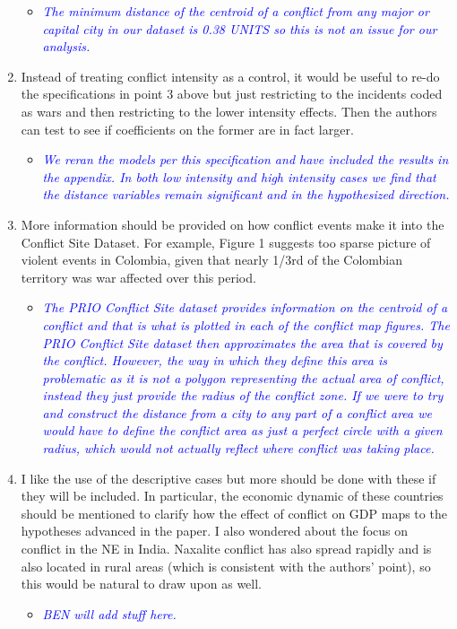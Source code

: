 \begin{enumerate}
\begin{itemize}
\item \textcolor{blue}{\emph{
	The minimum distance of the centroid of a conflict from any major or capital city in our dataset is 0.38 UNITS so this is not an issue for our analysis.
}}
\end{itemize}

\item Instead of treating conflict intensity as a control, it would be useful to re-do the specifications in point 3 above but just restricting to the incidents coded as wars and then restricting to the lower intensity effects. Then the authors can test to see if coefficients on the former are in fact larger.

\begin{itemize}
\item \textcolor{blue}{\emph{
	We reran the models per this specification and have included the results in the appendix. In both low intensity and high intensity cases we find that the distance variables remain significant and in the hypothesized direction. 
}}
\end{itemize}

\item More information should be provided on how conflict events make it into the Conflict Site Dataset. For example, Figure 1 suggests too sparse picture of violent events in Colombia, given that nearly 1/3rd of the Colombian territory was war affected over this period.

\begin{itemize}
\item \textcolor{blue}{\emph{
	The PRIO Conflict Site dataset provides information on the centroid of a conflict and that is what is plotted in each of the conflict map figures. The PRIO Conflict Site dataset then approximates the area that is covered by the conflict. However, the way in which they define this area is problematic as it is not a polygon representing the actual area of conflict, instead they just provide the radius of the conflict zone. If we were to try and construct the distance from a city to any part of a conflict area we would have to define the conflict area as just a perfect circle with a given radius, which would not actually reflect where conflict was taking place. 
}}
\end{itemize}

\item I like the use of the descriptive cases but more should be done with these if they will be included. In particular, the economic dynamic of these countries should be mentioned to clarify how the effect of conflict on GDP maps to the hypotheses advanced in the paper. I also wondered about the focus on conflict in the NE in India. Naxalite conflict has also spread rapidly and is also located in rural areas (which is consistent with the authors’ point), so this would be natural to draw upon as well.

\begin{itemize}
\item \textcolor{blue}{\emph{
	BEN will add stuff here. 
}}
\end{itemize}

\end{enumerate}